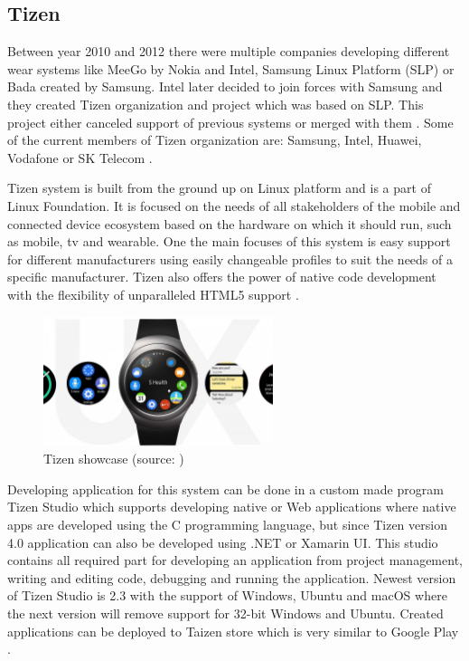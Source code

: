 \subsection{Tizen}\label{sec:Tizen}
Between year 2010 and 2012 there were multiple companies developing different wear systems like MeeGo by Nokia and Intel, Samsung Linux Platform (SLP) or Bada created by Samsung. Intel later decided to join forces with Samsung and they created Tizen organization and project which was based on SLP. This project either canceled support of previous systems or merged with them \cite{TOSBHR}. Some of the current members of Tizen organization are: Samsung, Intel, Huawei, Vodafone or SK Telecom \cite{TizenM}.

Tizen system is built from the ground up on Linux platform and is a part of Linux Foundation. It is focused on the needs of all stakeholders of the mobile and connected device ecosystem based on the hardware on which it should run, such as mobile, tv and wearable. One the main focuses of this system is easy support for different manufacturers using easily changeable profiles to suit the needs of a specific manufacturer. Tizen also offers the power of native code development with the flexibility of unparalleled HTML5 support \cite{TizenAbout}.

\begin{figure}[H]
	\begin{centering}
		\includegraphics[width=0.6\textwidth]{img/tizen}
		\par\end{centering}
	\caption{Tizen showcase (source: \cite{NFFAWSW})\label{fig:Tizen}}
	\label{fig05c04}
\end{figure}

Developing application for this system can be done in a custom made program Tizen Studio which supports developing native or Web applications where native apps are developed using the C programming language, but since Tizen version 4.0 application can also be developed using .NET or Xamarin UI. This studio contains all required part for developing an application from project management, writing and editing code, debugging and running the application. Newest version of Tizen Studio is 2.3 with the support of Windows, Ubuntu and macOS where the next version will remove support for 32-bit Windows and Ubuntu. Created applications can be deployed to Taizen store which is very similar to Google Play \cite{TizenDev}.


